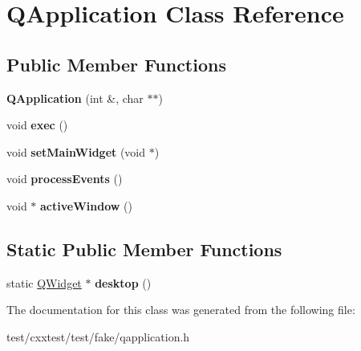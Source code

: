 \hypertarget{classQApplication}{\section{Q\-Application Class Reference}
\label{classQApplication}
}
\subsection*{Public Member Functions}
\begin{DoxyCompactItemize}
\item 
\hypertarget{classQApplication_a42782e1f1a6f6398f7692a36dcbf5831}{{\bfseries Q\-Application} (int \&, char $\ast$$\ast$)}\label{classQApplication_a42782e1f1a6f6398f7692a36dcbf5831}

\item 
\hypertarget{classQApplication_aceafcfc5e5f8b7ee8aaeb68961d8f312}{void {\bfseries exec} ()}\label{classQApplication_aceafcfc5e5f8b7ee8aaeb68961d8f312}

\item 
\hypertarget{classQApplication_a3e3438eb2c7ae0e4f8d7fd2683a52fb9}{void {\bfseries set\-Main\-Widget} (void $\ast$)}\label{classQApplication_a3e3438eb2c7ae0e4f8d7fd2683a52fb9}

\item 
\hypertarget{classQApplication_a92338bcfa28a68f175e41a96447cf31e}{void {\bfseries process\-Events} ()}\label{classQApplication_a92338bcfa28a68f175e41a96447cf31e}

\item 
\hypertarget{classQApplication_aed39d36ee949006f6a5160cf5935727a}{void $\ast$ {\bfseries active\-Window} ()}\label{classQApplication_aed39d36ee949006f6a5160cf5935727a}

\end{DoxyCompactItemize}
\subsection*{Static Public Member Functions}
\begin{DoxyCompactItemize}
\item 
\hypertarget{classQApplication_a4a5ddcd1996be32d329abd91c9f27c9f}{static \hyperlink{classQWidget}{Q\-Widget} $\ast$ {\bfseries desktop} ()}\label{classQApplication_a4a5ddcd1996be32d329abd91c9f27c9f}

\end{DoxyCompactItemize}


The documentation for this class was generated from the following file\-:\begin{DoxyCompactItemize}
\item 
test/cxxtest/test/fake/qapplication.\-h\end{DoxyCompactItemize}
